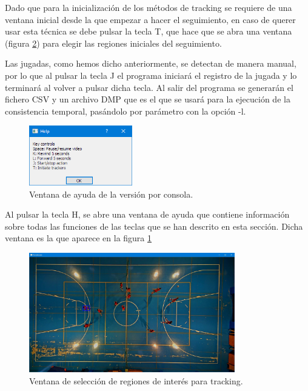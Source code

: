 Dado que para la inicialización de los métodos de tracking se requiere de una ventana inicial desde la que empezar a hacer el seguimiento, en caso de querer usar esta técnica se debe pulsar la tecla T, que hace que se abra una ventana (figura \ref{fig:iniciatracking}) para elegir las regiones iniciales del seguimiento.

Las jugadas, como hemos dicho anteriormente, se detectan de manera manual, por lo que al pulsar la tecla J el programa iniciará el registro de la jugada y lo terminará al volver a pulsar dicha tecla. Al salir del programa se generarán el fichero CSV y un archivo DMP que es el que se usará para la ejecución de la consistencia temporal, pasándolo por parámetro con la opción -l.

\begin{figure}
    \centering
    \includegraphics[width=0.4\textwidth]{images/help}
    \caption{Ventana de ayuda de la versión por consola.}
    \label{fig:helpconsola}
\end{figure}

Al pulsar la tecla H, se abre una ventana de ayuda que contiene información sobre todas las funciones de las teclas que se han descrito en esta sección. Dicha ventana es la que aparece en la figura \ref{fig:helpconsola}

\begin{figure}
    \centering
    \includegraphics[width=0.8\textwidth]{images/ejemplotracking}
    \caption{Ventana de selección de regiones de interés para tracking.}
    \label{fig:iniciatracking}
\end{figure}

